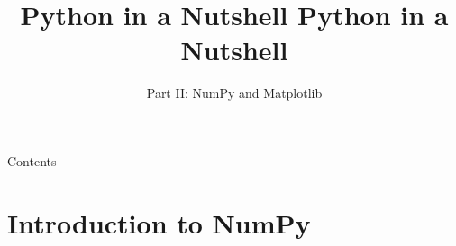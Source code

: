 \documentclass[colorlinks]{beamer}
\begin{document}
\setcounter{tocdepth}{2}

\title{ Python in a Nutshell}







\title{ Python in a Nutshell}
\subtitle
 {Part II: NumPy and Matplotlib } %




\begin{frame}[plain]
   \maketitle
\end{frame}

\begin{frame}[allowframebreaks]{Contents}
  \tableofcontents
\end{frame}

\section{Introduction to NumPy}
\end{document}
